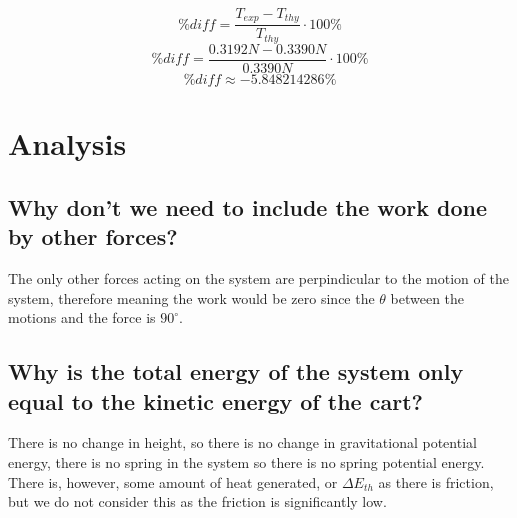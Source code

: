 \documentclass[11pt, letterpaper, includehead]{article}
\begin{document}
$$\%diff = \frac{T_{exp} - T_{thy}}{T_{thy}}\cdot 100\%$$
$$\%diff = \frac{0.3192N - 0.3390N}{0.3390N}\cdot 100\%$$
$$\%diff \approx \boxed{-5.848214286\%}$$

\section{Analysis}
\subsection{Why don't we need to include the work done by other forces?}
The only other forces acting on the system are perpindicular
to the motion of the system, therefore meaning the work would be zero
since the $\theta$ between the motions and the force is $90^{\circ}$.
\subsection{Why is the total energy of the system only equal to the kinetic energy of the cart?}
There is no change in height, so there is no change in gravitational potential
energy, there is no spring in the system so there is no spring potential energy.
There is, however, some amount of heat generated, or $\Delta E_{th}$ as there is friction,
but we do not consider this as the friction is significantly low.
\end{document}
